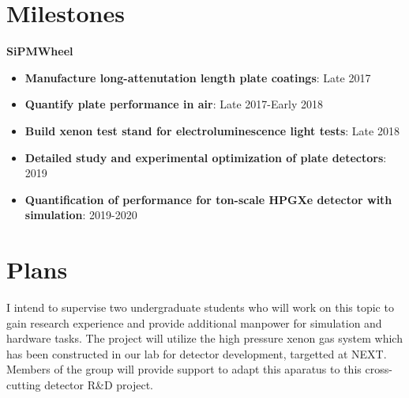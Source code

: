 \section*{\textbf{Milestones}}
\noindent\textbf{SiPMWheel}
\begin{itemize}[noitemsep,nolistsep]
\item{\textbf{Manufacture long-attenutation length plate coatings}}: Late 2017
\item{\textbf{Quantify plate performance in air}}: Late 2017-Early 2018
\item{\textbf{Build xenon test stand for electroluminescence light tests}}: Late 2018
\item{\textbf{Detailed study and experimental optimization of plate detectors}}: 2019
\item{\textbf{Quantification of performance for ton-scale HPGXe detector with simulation}}: 2019-2020

\end{itemize}


\section*{\textbf{Plans}}
I intend to supervise two undergraduate students who will work on this topic to gain research experience and provide additional manpower for simulation and hardware tasks. The project will utilize the high pressure xenon gas system which has been constructed in our lab for detector development, targetted at NEXT.  Members of the group will provide support to adapt this aparatus to this cross-cutting detector R\&D project.